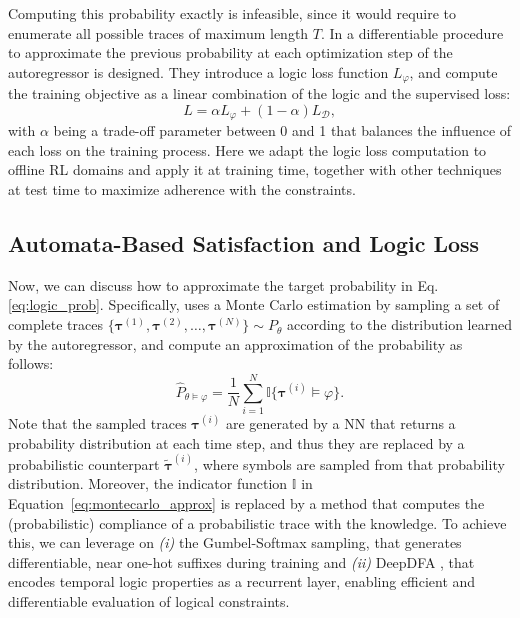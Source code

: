 \noindent
Computing this probability exactly is infeasible, since it would require to enumerate all possible traces of maximum length $T$. In \cite{UmiliPMAI24,mezini2025neuro} a differentiable procedure to approximate the previous probability at each optimization step of the autoregressor is designed. They introduce a logic loss function $L_\varphi$, and compute the training objective as a linear combination of the logic and the supervised loss:
\begin{equation}
\label{eq:loss_balance}
    L = \alpha L_\varphi + (1 - \alpha) L_{\mathcal{D}},
\end{equation}
%
with $\alpha$ being a trade-off parameter between 0 and 1 that balances the influence of each loss on the training process.
Here we adapt the logic loss computation to offline RL domains and apply it at training time, together with other techniques at test time to maximize adherence with the constraints. 


\subsection{Automata-Based Satisfaction and Logic Loss}

Now, we can discuss how to approximate the target probability in Eq. \ref{eq:logic_prob}. Specifically, \cite{mezini2025neuro} uses a Monte Carlo estimation by sampling a set of complete traces $\{\boldsymbol{\tau}^{(1)}, \boldsymbol{\tau}^{(2)}, \ldots, \boldsymbol{\tau}^{(N)}\} \sim P_\theta$ according to the distribution learned by the autoregressor, and compute an approximation of the probability as follows:
\begin{equation} \label{eq:montecarlo_approx}
    \hat{P}_{\theta \vDash \varphi} = \frac{1}{N} \sum_{i=1}^N \mathbb{I} \{ \boldsymbol{\tau}^{(i)} \vDash \varphi \}.
\end{equation}
%
Note that the sampled traces $\boldsymbol{\tau}^{(i)}$ are generated by a NN that returns a probability distribution at each time step, and thus they are replaced by a probabilistic counterpart $\tilde{\boldsymbol{\tau}}^{(i)}$, where symbols are sampled from that probability distribution. Moreover, the indicator function $\mathbb{I}$ in Equation~\ref{eq:montecarlo_approx} is replaced by a method that computes the (probabilistic) compliance of a probabilistic trace with the knowledge. To achieve this, we can leverage on \emph{(i)} the Gumbel-Softmax sampling, that generates differentiable, near one-hot suffixes during training and \emph{(ii)} DeepDFA \cite{deepdfa_ecai2024}, that encodes temporal logic properties as a recurrent layer, enabling efficient and differentiable evaluation of logical constraints.

